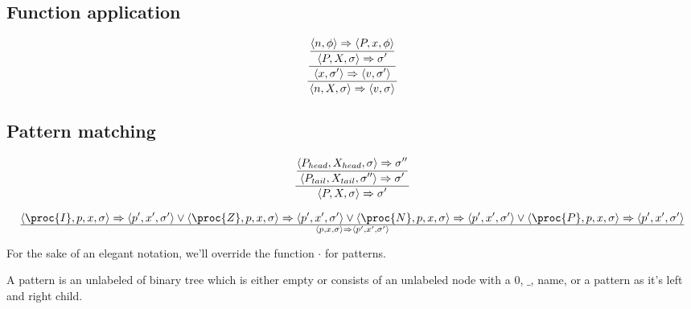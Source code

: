 \subsection{Function application}

\begin{equation}
{\displaystyle
{\displaystyle
{\displaystyle
  \left\langle n, \phi\right\rangle
  \Rightarrow
  \left\langle P, x, \phi\right\rangle
\over\displaystyle
  \left\langle P, X, \sigma\right\rangle
  \Rightarrow
  \sigma'
}
\over\displaystyle
  \left\langle x, \sigma'\right\rangle
  \Rightarrow
  \left\langle v,\sigma'\right\rangle
}
\over\displaystyle
    \left\langle n,X,\sigma\right\rangle
    \Rightarrow
    \left\langle v,\sigma\right\rangle
}
\end{equation}

\subsection{Pattern matching}

\begin{equation}
{\displaystyle
{\displaystyle
  \left\langle P_{head}, X_{head}, \sigma\right\rangle
  \Rightarrow
  \sigma''
\over\displaystyle
  \left\langle P_{tail}, X_{tail}, \sigma''\right\rangle
  \Rightarrow
  \sigma'
}
\over\displaystyle
  \left\langle P, X, \sigma\right\rangle
  \Rightarrow
  \sigma'
}
\end{equation}

\begin{equation}
{
  \left\langle\proc{I}, p,x,\sigma\right\rangle
  \Rightarrow
  \left\langle p',x',\sigma'\right\rangle
\vee
  \left\langle\proc{Z}, p,x,\sigma\right\rangle
  \Rightarrow
  \left\langle p',x',\sigma'\right\rangle
\vee
  \left\langle\proc{N}, p,x,\sigma\right\rangle
  \Rightarrow
  \left\langle p',x',\sigma'\right\rangle
\vee
  \left\langle\proc{P}, p,x,\sigma\right\rangle
  \Rightarrow
  \left\langle p',x',\sigma'\right\rangle
}\over{
  \left\langle p, x, \sigma\right\rangle
  \Rightarrow
  \left\langle p', x', \sigma'\right\rangle
}
\end{equation}

For the sake of an elegant notation, we'll override the function $\cdot$ for
patterns.

\begin{definition}

A pattern is an unlabeled of binary tree which is either empty or consists of
an unlabeled node with a $0$, $\_$, name, or a pattern as it's left and right
child. 

\end{definition}

